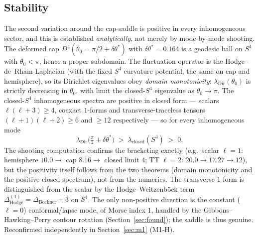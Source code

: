 \documentclass[11pt,a4paper]{article}
\theoremstyle{plain}
\theoremstyle{definition}
\theoremstyle{remark}
\newcommand{\dtheta}{\delta\theta}
\begin{document}
\subsection{Stability}
The second variation around the cap-saddle is positive in every inhomogeneous sector, and this
is established \emph{analytically}, not merely by mode-by-mode shooting. The deformed cap
$D^4(\theta_0 = \pi/2 + \dtheta^*)$ with $\dtheta^* = 0.164$ is a geodesic ball on $S^4$ with
$\theta_0 < \pi$, hence a proper subdomain. The fluctuation operator is the Hodge--de~Rham
Laplacian (with the fixed $S^4$ curvature potential, the same on cap and hemisphere), so its
Dirichlet eigenvalues obey \emph{domain monotonicity}: $\lambda_{\mathrm{Dir}}(\theta_0)$ is
strictly decreasing in $\theta_0$, with limit the closed-$S^4$ eigenvalue as $\theta_0\to\pi$.
The closed-$S^4$ inhomogeneous spectra are positive in closed form --- scalars $\ell(\ell+3)\ge4$,
coexact $1$-forms and transverse-traceless tensors $(\ell+1)(\ell+2)\ge6$ and $\ge12$
respectively --- so for every inhomogeneous mode
\[
\lambda_{\mathrm{Dir}}\big(\tfrac\pi2+\dtheta^*\big) \;>\; \lambda_{\mathrm{closed}}(S^4) \;>\; 0 .
\]
The shooting computation confirms the bracketing exactly (e.g.\ scalar $\ell=1$: hemisphere
$10.0 \to$ cap $8.16 \to$ closed limit $4$; TT $\ell=2$: $20.0\to17.27\to12$), but the positivity
itself follows from the two theorems (domain monotonicity and the positive closed spectrum),
not from the numerics. The transverse $1$-form is distinguished from the scalar by the
Hodge--Weitzenb\"ock term $\Delta^{(1)}_{\mathrm{Hodge}} = \Delta_{\mathrm{Bochner}} + 3$ on
$S^4$. The only non-positive direction is the constant ($\ell=0$) conformal/lapse mode, of Morse
index $1$, handled by the Gibbons--Hawking--Perry contour rotation (Section~\ref{sec:found});
the saddle is thus genuine. Reconfirmed independently in Section~\ref{sec:m1} (M1-H).
\end{document}
